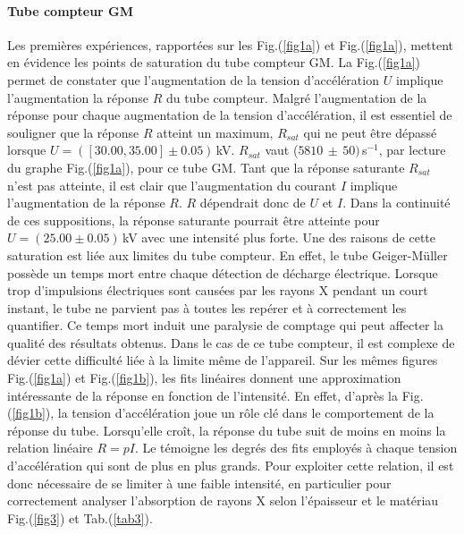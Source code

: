 \documentclass[a4paper, 12pt,oneside]{article}
\begin{document}
\paragraph{Tube compteur GM}
Les premières expériences, rapportées sur les Fig.(\ref{fig1a}) et Fig.(\ref{fig1a}), mettent en évidence les points de saturation du tube compteur GM. La Fig.(\ref{fig1a}) permet de constater que l'augmentation de la tension d’accélération $U$ implique l'augmentation la réponse $R$ du tube compteur. Malgré l'augmentation de la réponse pour chaque augmentation de la tension d'accélération, il est essentiel de souligner que la réponse $R$ atteint un maximum, $R_{sat}$ qui ne peut être dépassé lorsque $U=([30.00,35.00]\pm0.05)$\,kV. $R_{sat}$ vaut ($5810\,\pm\,50)$\,s$^{-1}$, par lecture du graphe Fig.(\ref{fig1a}), pour ce tube GM. Tant que la réponse saturante $R_{sat}$ n’est pas atteinte, il est clair que l’augmentation du courant $I$ implique l’augmentation de la réponse $R$. $R$ dépendrait donc de $U$ et $I$. Dans la continuité de ces suppositions, la réponse saturante pourrait être atteinte pour $U=(25.00\pm0.05)$\,kV avec une intensité plus forte. Une des raisons de cette saturation est liée aux limites du tube compteur. En effet, le tube Geiger-Müller possède un temps mort entre chaque détection de décharge électrique. Lorsque trop d’impulsions électriques sont causées par les rayons X pendant un court instant, le tube ne parvient pas à toutes les repérer et à correctement les quantifier. Ce temps mort induit une paralysie de comptage qui peut affecter la qualité des résultats obtenus. Dans le cas de ce tube compteur, il est complexe de dévier cette difficulté liée à la limite même de l'appareil. Sur les mêmes figures Fig.(\ref{fig1a}) et Fig.(\ref{fig1b}), les fits linéaires donnent une approximation intéressante de la réponse en fonction de l'intensité. En effet, d'après la Fig.(\ref{fig1b}), la tension d'accélération joue un rôle clé dans le comportement de la réponse du tube. Lorsqu'elle croît, la réponse du tube suit de moins en moins la relation linéaire $R = pI$. Le témoigne les degrés des fits employés à chaque tension d'accélération qui sont de plus en plus grands. Pour exploiter cette relation, il est donc nécessaire de se limiter à une faible intensité, en particulier pour correctement analyser l'absorption de rayons X selon l'épaisseur et le matériau Fig.(\ref{fig3}) et Tab.(\ref{tab3}).
\vspace{-0.35cm}
\end{document}
